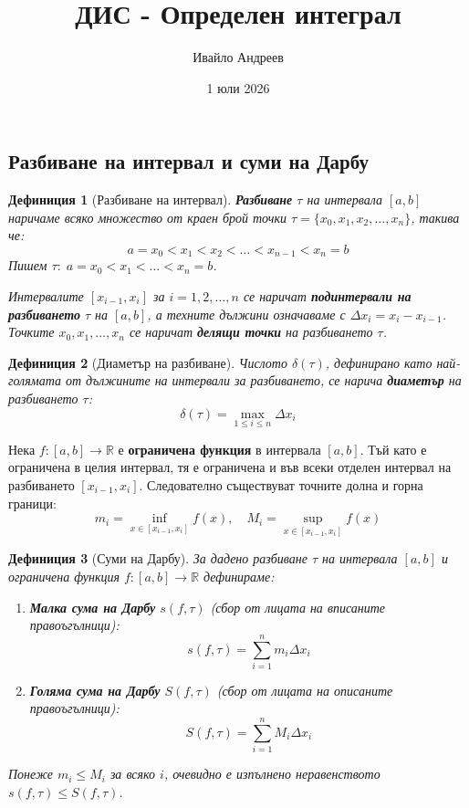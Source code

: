 \documentclass{scrartcl}
\title{ДИС - Определен интеграл}
\author{Ивайло Андреев}
\date{1 юли 2026}
\newtheorem{definition}{Дефиниция}
\begin{document}
\maketitle

\tableofcontents

\newpage

\begin{FlushLeft}

\section{Разбиване на интервал и суми на Дарбу}

\begin{definition}[Разбиване на интервал]
\textbf{Разбиване} $\tau$ на интервала $[a, b]$ наричаме всяко множество от краен брой точки $\tau = \{x_0, x_1, x_2, \dots, x_n\}$, такива че:
\[ a = x_0 < x_1 < x_2 < \dots < x_{n-1} < x_n = b \]
Пишем $\tau\colon\; a = x_0 < x_1 < \dots < x_n = b$.

Интервалите $[x_{i-1}, x_i]$ за $i = 1, 2, \dots, n$ се наричат \textbf{подинтервали на разбиването} $\tau$ на $[a, b]$, а техните дължини означаваме с $\Delta x_i = x_i - x_{i-1}$. Точките $x_0, x_1, \dots, x_n$ се наричат \textbf{делящи точки} на разбиването $\tau$.
\end{definition}

\begin{definition}[Диаметър на разбиване]
Числото $\delta(\tau)$, дефинирано като най-голямата от дължините на интервали за разбиването, се нарича \textbf{диаметър} на разбиването $\tau$:
\[ \delta(\tau) = \max_{1 \le i \le n} \Delta x_i \]
\end{definition}

Нека $f: [a, b] \to \mathbb{R}$ е \textbf{ограничена функция} в интервала $[a, b]$. Тъй като е ограничена в целия интервал, тя е ограничена и във всеки отделен интервал на разбиването $[x_{i-1}, x_i]$. Следователно съществуват точните долна и горна граници:
\[ m_i = \inf_{x \in [x_{i-1}, x_i]} f(x), \quad M_i = \sup_{x \in [x_{i-1}, x_i]} f(x) \]

\begin{definition}[Суми на Дарбу]
За дадено разбиване $\tau$ на интервала $[a, b]$ и ограничена функция $f: [a, b] \to \mathbb{R}$ дефинираме:
\begin{enumerate}
    \item \textbf{Малка сума на Дарбу} $s(f, \tau)$ (сбор от лицата на вписаните правоъгълници):
    \[ s(f, \tau) = \sum_{i=1}^{n} m_i \Delta x_i \]
    \item \textbf{Голяма сума на Дарбу} $S(f, \tau)$ (сбор от лицата на описаните правоъгълници):
    \[ S(f, \tau) = \sum_{i=1}^{n} M_i \Delta x_i \]
\end{enumerate}
Понеже $m_i \le M_i$ за всяко $i$, очевидно е изпълнено неравенството $s(f, \tau) \le S(f, \tau)$.
\end{definition}


\end{FlushLeft}
\end{document}
